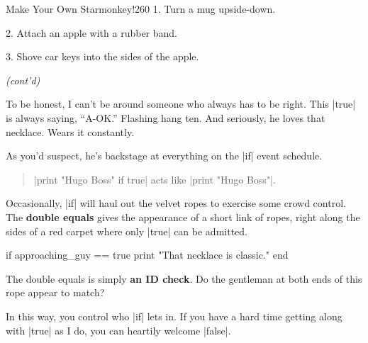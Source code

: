 \documentclass[12pt,twoside]{report}
\begin{document}
	\begin{sidebar}{Make Your Own Starmonkey!}{260}
		\vspace{6pt}
		1. Turn a mug upside-down.

		\vspace{6pt}
		\vspace{6pt}

		2. Attach an apple with a rubber band.

		\vspace{6pt}
		\vspace{6pt}

		3. Shove car keys into the sides of the apple.

		\vspace{6pt}
		\vspace{6pt}

		\textit{(cont'd)}
		\vspace{6pt} 
	\end{sidebar}

To be honest, I can't be around someone who always has to be
right. This \rubyinline|true| is always saying,
``A-OK.''  Flashing hang ten.  And seriously, he loves that necklace.
Wears it constantly.

As you'd suspect, he's backstage at everything on the
\rubyinline|if| event schedule.

\begin{quote}
\rubyinline|print "Hugo Boss" if true| acts like
\rubyinline|print "Hugo Boss"|.\end{quote}


Occasionally, \rubyinline|if| will haul out the
velvet ropes to exercise some crowd control.  The {\bf double equals}
gives the appearance of a short link of ropes, right along the sides
of a red carpet where only \rubyinline|true| can be
admitted.


\begin{rubycode}

 if approaching_guy == true 
   print "That necklace is classic."  
 end

\end{rubycode}


The double equals is simply {\bf an ID check}.  Do the gentleman at
both ends of this rope appear to match?

In this way, you control who \rubyinline|if| lets in.
If you have a hard time getting along with
\rubyinline|true| as I do, you can heartily welcome
\rubyinline|false|.
\end{document}
